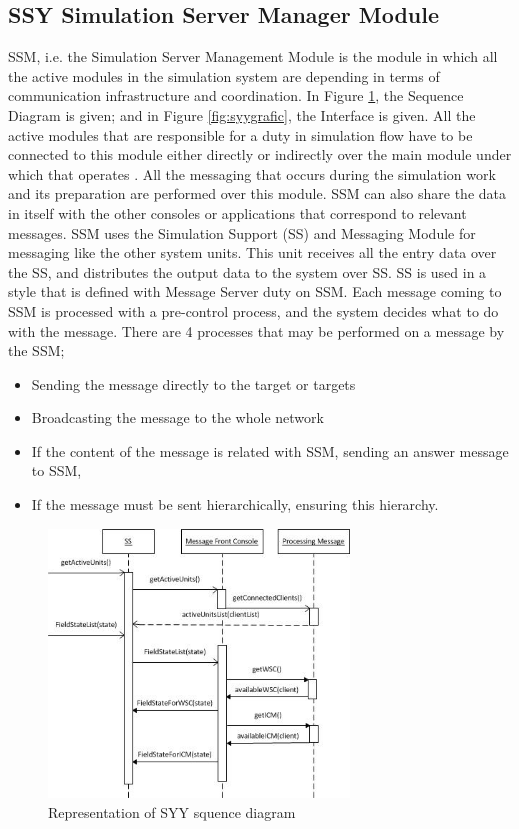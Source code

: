 \documentclass[conference]{IEEEtran}
\begin{document}
\subsection{SSY Simulation Server Manager Module}
SSM, i.e. the Simulation Server Management Module is the module in which all the active modules in the simulation system are depending in terms of communication infrastructure and coordination. In Figure \ref{fig:syySequenceDiagram}, the Sequence Diagram is given; and in Figure \ref{fig:syygrafic}, the Interface is given. 
All the active modules that are responsible for a duty in simulation flow have to be connected to this module either directly or indirectly over the main module under which that operates \cite{network1,network2,network3,network4}. All the messaging that occurs during the simulation work and its preparation are performed over this module. SSM can also share the data in itself with the other consoles or applications that correspond to relevant messages. SSM uses the Simulation Support (SS) and Messaging Module for messaging like the other system units. This unit receives all the entry data over the SS, and distributes the output data to the system over SS. SS is used in a style that is defined with Message Server duty on SSM. Each message coming to SSM is processed with a pre-control process, and the system decides what to do with the message. There are 4 processes that may be performed on a message by the SSM;

\begin{itemize}
\item Sending the message directly to the target or targets
\item Broadcasting the message to the whole network
\item If the content of the message is related with SSM, sending an answer message to SSM, 
\item If the message must be sent hierarchically, ensuring this hierarchy.  
\end{itemize}






\begin{figure}[h!]
  \centering
  \includegraphics[width=8cm]{syySequenceDiagram.jpg}
  \caption{Representation of SYY squence diagram}\label{fig:syySequenceDiagram}
\end{figure}
\end{document}
